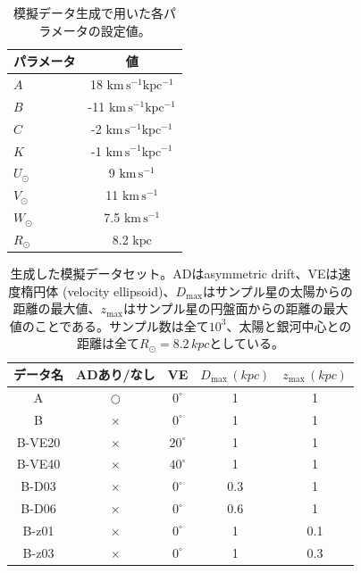 \begin{table}
\begin{center}
\begin{tabular}{l|c} \hline
 \rowcolor{LightCyan}
 パラメータ & 値\\
 \hline
 $A$ & 18 $\mathrm{km\,s^{-1} kpc^{-1}}$\\
 \hline
 $B$ & -11 $\mathrm{km\,s^{-1} kpc^{-1}}$\\
 \hline
 $C$ & -2 $\mathrm{km\,s^{-1} kpc^{-1}}$\\
 \hline
 $K$ & -1 $\mathrm{km\,s^{-1} kpc^{-1}}$\\
 \hline
 $U_{\odot}$ & 9 $\mathrm{km\,s^{-1}}$\\
 \hline
 $V_{\odot}$ & 11 $\mathrm{km\,s^{-1}}$\\
 \hline
 $W_{\odot}$ & 7.5 $\mathrm{km\,s^{-1}}$\\
 \hline
 $R_{\odot}$ & 8.2 $\mathrm{kpc}$\\
 \hline
\end{tabular}
\vspace{3mm}
\caption{模擬データ生成で用いた各パラメータの設定値。}
\label{table4}
\end{center}
\end{table}

\begin{table}
\begin{center}
\begin{tabular}{c|c|c|c|c} \hline
 \rowcolor{LightCyan}
 データ名 & ADあり/なし & VE & $D_{\mathrm{max}}\,(\si{kpc})$ & $z_{\mathrm{max}}\,(\si{kpc})$\\
 \hline
 A & $\bigcirc$ & $0^{\circ}$ & 1 & 1\\
 \hline
 B & $\times$ & $0^{\circ}$ & 1 & 1\\
 \hline
 B-VE20 & $\times$ & $20^{\circ}$ & 1 & 1\\
 \hline
 B-VE40 & $\times$ & $40^{\circ}$ & 1 & 1\\
 \hline
 B-D03 & $\times$ & $0^{\circ}$ & 0.3 & 1\\
 \hline
 B-D06 & $\times$ & $0^{\circ}$ & 0.6 & 1\\
 \hline
 B-z01 & $\times$ & $0^{\circ}$ & 1 & 0.1\\
 \hline
 B-z03 & $\times$ & $0^{\circ}$ & 1 & 0.3\\
 \hline
\end{tabular}
\vspace{3mm}
\caption{生成した模擬データセット。ADはasymmetric drift、VEは速度楕円体 (velocity ellipsoid)、$D_{\mathrm{max}}$はサンプル星の太陽からの距離の最大値、$z_{\mathrm{max}}$はサンプル星の円盤面からの距離の最大値のことである。サンプル数は全て$10^3$、太陽と銀河中心との距離は全て$R_{\odot}=8.2\,\si{kpc}$としている。}
\label{table6}
\end{center}
\end{table}

